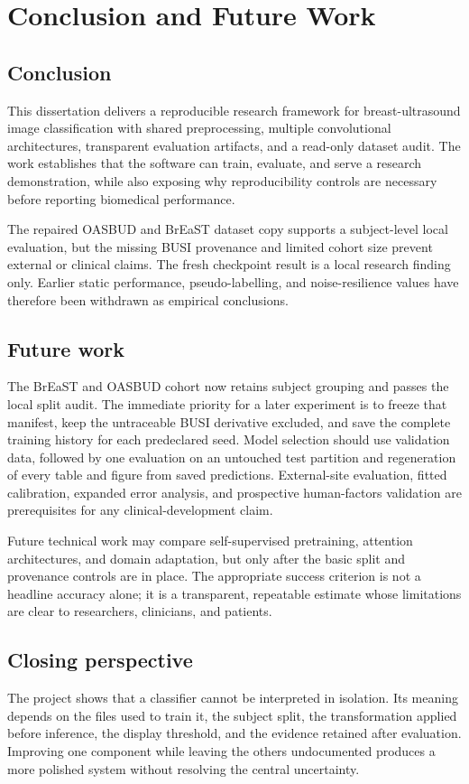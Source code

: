 \chapter{Conclusion and Future Work}

\section{Conclusion}
This dissertation delivers a reproducible research framework for breast-ultrasound image classification with shared preprocessing, multiple convolutional architectures, transparent evaluation artifacts, and a read-only dataset audit. The work establishes that the software can train, evaluate, and serve a research demonstration, while also exposing why reproducibility controls are necessary before reporting biomedical performance.

The repaired OASBUD and BrEaST dataset copy supports a subject-level local evaluation, but the missing BUSI provenance and limited cohort size prevent external or clinical claims. The fresh checkpoint result is a local research finding only. Earlier static performance, pseudo-labelling, and noise-resilience values have therefore been withdrawn as empirical conclusions.

\section{Future work}
The BrEaST and OASBUD cohort now retains subject grouping and passes the local split audit. The immediate priority for a later experiment is to freeze that manifest, keep the untraceable BUSI derivative excluded, and save the complete training history for each predeclared seed. Model selection should use validation data, followed by one evaluation on an untouched test partition and regeneration of every table and figure from saved predictions. External-site evaluation, fitted calibration, expanded error analysis, and prospective human-factors validation are prerequisites for any clinical-development claim.

Future technical work may compare self-supervised pretraining, attention architectures, and domain adaptation, but only after the basic split and provenance controls are in place. The appropriate success criterion is not a headline accuracy alone; it is a transparent, repeatable estimate whose limitations are clear to researchers, clinicians, and patients.

\section{Closing perspective}
The project shows that a classifier cannot be interpreted in isolation. Its meaning depends on the files used to train it, the subject split, the transformation applied before inference, the display threshold, and the evidence retained after evaluation. Improving one component while leaving the others undocumented produces a more polished system without resolving the central uncertainty.

